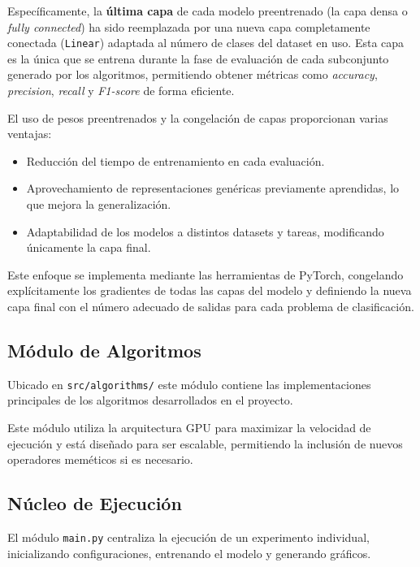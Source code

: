 Específicamente, la \textbf{última capa} de cada modelo preentrenado (la capa densa o \textit{fully connected})
ha sido reemplazada por una nueva capa completamente conectada (\texttt{Linear}) adaptada al número de clases del dataset en uso.
Esta capa es la única que se entrena durante la fase de evaluación de cada subconjunto generado por los algoritmos,
permitiendo obtener métricas como \textit{accuracy}, \textit{precision}, \textit{recall} y \textit{F1-score} de forma eficiente.

El uso de pesos preentrenados y la congelación de capas proporcionan varias ventajas:
\begin{itemize}
      \item Reducción del tiempo de entrenamiento en cada evaluación.
      \item Aprovechamiento de representaciones genéricas previamente aprendidas, lo que mejora la generalización.
      \item Adaptabilidad de los modelos a distintos datasets y tareas, modificando únicamente la capa final.
\end{itemize}

Este enfoque se implementa mediante las herramientas de PyTorch,
congelando explícitamente los gradientes de todas las capas del modelo y definiendo la nueva capa final con el número adecuado de salidas para cada problema de clasificación.

\subsection{Módulo de Algoritmos}\label{subsec:modulo-de-algoritmos}
Ubicado en \texttt{src/algorithms/} este módulo contiene las implementaciones principales de los
algoritmos desarrollados en el proyecto.

Este módulo utiliza la arquitectura GPU para maximizar la velocidad de ejecución y está diseñado para ser escalable,
permitiendo la inclusión de nuevos operadores meméticos si es necesario.

\subsection{Núcleo de Ejecución}\label{subsec:nucleo-de-ejecucion}
El módulo \texttt{main.py} centraliza la ejecución de un experimento individual, inicializando configuraciones,
entrenando el modelo y generando gráficos.

